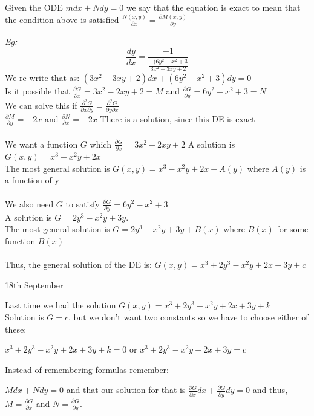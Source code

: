 \documentclass[11pt]{article}
\theoremstyle{definition}
\begin{document}
Given the ODE $mdx + Ndy = 0$ we say that the equation is exact to mean that the condition above is satisfied $\frac{N(x,y)}{\partial x} = \frac{\partial M(x,y)}{\partial y}$

\textit{Eg:}
$$
\frac{dy}{dx} = \frac{-1}{\frac{-(6y^2-x^2+3}{3x^2-3xy+2}}
$$
We re-write that as: $(3x^2-3xy+2)dx + (6y^2-x^2+3)dy = 0$\\
Is it possible that $\frac{\partial G}{\partial x} = 3x^2-2xy + 2 = M$ and $\frac{\partial G}{\partial y} = 6y^2 -x^2 + 3 = N$\\
We can solve this if $\frac{\partial^2G}{\partial x \partial y} = \frac{\partial^2G}{\partial y \partial x}$\\
$\frac{\partial M}{\partial y} = -2x$ and $\frac{\partial N}{\partial x} = -2x$
There is a solution, since this DE is exact\\\\
We want a function $G$ which $\frac{\partial G}{\partial x} = 3x^2 + 2xy + 2$
A solution is $G(x,y) = x^3 -x^2y + 2x$\\The most general solution is $G(x,y) = x^3 -x^2y + 2x + A(y)$ where $A(y)$ is a function of y\\\\
We also need $G$ to satisfy $\frac{\partial G}{\partial y} = 6y^2 -x^2 + 3$\\
A solution is $G = 2y^3 -x^2y + 3y$.\\ The most general solution is $G = 2y^3 -x^2y + 3y + B(x)$ where $B(x)$ for some function $B(x)$\\\\
Thus, the general solution of the DE is: $G(x,y) = x^3 + 2y^3 - x^2y + 2x + 3y + c$

\newpage

\begin{center}
    {\LARGE 18th September}\\
\end{center}
Last time we had the solution $G(x,y) = x^3 + 2y^3 - x^2y + 2x + 3y + k$\\
Solution is $G=c$, but we don't want two constants so we have to choose either of these:

$x^3 + 2y^3 - x^2y + 2x + 3y + k = 0$ or $x^3 + 2y^3 - x^2y + 2x + 3y = c$

Instead of remembering formulas remember:

$Mdx + Ndy = 0$ and that our solution for that is $\frac{\partial G}{\partial x}dx + \frac{\partial G}{\partial y}dy = 0$ and thus, $M=\frac{\partial G}{\partial x}$ and $N = \frac{\partial G}{\partial y}$.
\end{document}
